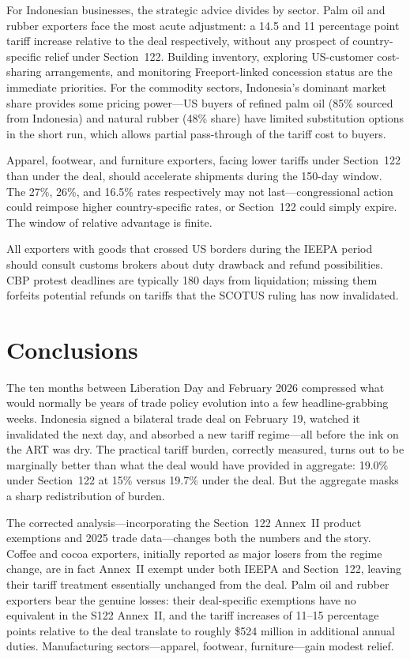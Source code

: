 \documentclass[12pt,a4paper]{article}
\begin{document}
For Indonesian businesses, the strategic advice divides by sector. Palm oil and rubber exporters face the most acute adjustment: a 14.5 and 11 percentage point tariff increase relative to the deal respectively, without any prospect of country-specific relief under Section~122. Building inventory, exploring US-customer cost-sharing arrangements, and monitoring Freeport-linked concession status are the immediate priorities. For the commodity sectors, Indonesia's dominant market share provides some pricing power---US buyers of refined palm oil (85\% sourced from Indonesia) and natural rubber (48\% share) have limited substitution options in the short run, which allows partial pass-through of the tariff cost to buyers.

Apparel, footwear, and furniture exporters, facing lower tariffs under Section~122 than under the deal, should accelerate shipments during the 150-day window. The 27\%, 26\%, and 16.5\% rates respectively may not last---congressional action could reimpose higher country-specific rates, or Section~122 could simply expire. The window of relative advantage is finite.

All exporters with goods that crossed US borders during the IEEPA period should consult customs brokers about duty drawback and refund possibilities. CBP protest deadlines are typically 180 days from liquidation; missing them forfeits potential refunds on tariffs that the SCOTUS ruling has now invalidated.

\section{Conclusions}

The ten months between Liberation Day and February 2026 compressed what would normally be years of trade policy evolution into a few headline-grabbing weeks. Indonesia signed a bilateral trade deal on February 19, watched it invalidated the next day, and absorbed a new tariff regime---all before the ink on the ART was dry. The practical tariff burden, correctly measured, turns out to be marginally better than what the deal would have provided in aggregate: 19.0\% under Section~122 at 15\% versus 19.7\% under the deal. But the aggregate masks a sharp redistribution of burden.

The corrected analysis---incorporating the Section~122 Annex~II product exemptions and 2025 trade data---changes both the numbers and the story. Coffee and cocoa exporters, initially reported as major losers from the regime change, are in fact Annex~II exempt under both IEEPA and Section~122, leaving their tariff treatment essentially unchanged from the deal. Palm oil and rubber exporters bear the genuine losses: their deal-specific exemptions have no equivalent in the S122 Annex~II, and the tariff increases of 11--15 percentage points relative to the deal translate to roughly \$524 million in additional annual duties. Manufacturing sectors---apparel, footwear, furniture---gain modest relief.
\end{document}
